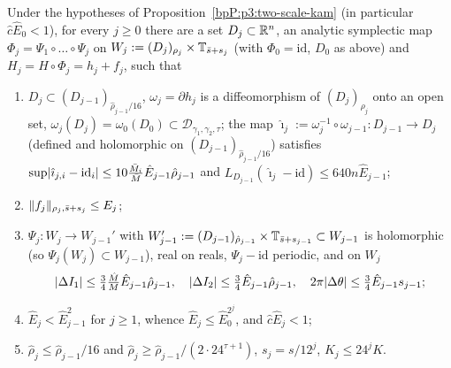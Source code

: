 \begin{lemma}\label{bpP:p3:iterative}
Under the hypotheses of Proposition~\ref{bpP:p3:two-scale-kam} (in particular $\hat c\hat E_0<1$), for every $j\ge0$ there are a set $D_j\subset\mathbb{R}^n$, an analytic symplectic map $\Phi_j=\Psi_1\circ\dots\circ\Psi_j$ on $W_j:=(D_j)_{\rho_j}\times\mathbb{T}_{\bar s+s_j}$ (with $\Phi_0=\mathrm{id}$, $D_0$ as above) and $H_j=H\circ\Phi_j=h_j+f_j$, such that
\begin{enumerate}[label=(\roman*)]
\item $D_j\subset(D_{j-1})_{\hat\rho_{j-1}/16}$, $\omega_j=\partial h_j$ is a diffeomorphism of $(D_j)_{\rho_j}$ onto an open set, $\omega_j(D_j)=\omega_0(D_0)\subset\mathcal D_{\gamma_1,\gamma_2,\tau}$; the map $\hat\imath_j:=\omega_j^{-1}\circ\omega_{j-1}:D_{j-1}\to D_j$ (defined and holomorphic on $(D_{j-1})_{\hat\rho_{j-1}/16}$) satisfies
$\sup\lvert \hat\imath_{j,i}-\mathrm{id}_i\rvert\le10\frac{\bar M_i}{\bar M}\hat E_{j-1}\hat\rho_{j-1}$ and $L_{D_{j-1}}(\hat\imath_j-\mathrm{id})\le640n\hat E_{j-1}$;
\item $\lVert f_j\rVert_{\rho_j,\bar s+s_j}\le E_j$;
\item $\Psi_j:W_j\to W_{j-1}'$ with $W_{j-1}':=(D_{j-1})_{\hat\rho_{j-1}}\times\mathbb{T}_{\bar s+s_{j-1}}\subset W_{j-1}$ is holomorphic (so $\Psi_j(W_j)\subset W_{j-1}$), real on reals, $\Psi_j-\mathrm{id}$ periodic, and on $W_j$
\[\lvert \Delta I_1\rvert\le\tfrac34\tfrac{\hat M}M\hat E_{j-1}\hat\rho_{j-1},\quad\lvert \Delta I_2\rvert\le\tfrac34\hat E_{j-1}\hat\rho_{j-1},\quad2\pi\lvert \Delta\theta\rvert\le\tfrac34\hat E_{j-1}s_{j-1};\]
\item $\hat E_j<\hat E_{j-1}^2$ for $j\ge1$, whence $\hat E_j\le\hat E_0^{2^j}$, and $\hat c\hat E_j<1$;
\item $\hat\rho_j\le\hat\rho_{j-1}/16$ and $\hat\rho_j\ge\hat\rho_{j-1}/(2\cdot24^{\tau+1})$, $s_j=s/12^j$, $K_j\le24^jK$.
\end{enumerate}
\end{lemma}
